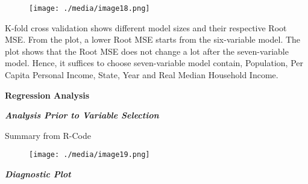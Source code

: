 \documentclass[12pt]{article}
\begin{document}
\begin{figure}[H]
	\begin{Center}
		\texttt{[image: ./media/image18.png]}
	\end{Center}
\end{figure}



\par

K-fold cross validation shows different model sizes and their respective Root MSE. From the plot, a lower Root MSE starts from the six-variable model. The plot shows that the Root MSE does not change a lot after the seven-variable model. Hence, it suffices to choose seven-variable model contain, Population, Per Capita Personal Income, State, Year and Real Median Household Income.\par

\begin{Center}
\textbf{Regression Analysis}
\end{Center}\par

\textbf{\textit{Analysis Prior to Variable Selection}}\par

Summary from R-Code\par




\begin{figure}[H]
	\begin{Center}
		\texttt{[image: ./media/image19.png]}
	\end{Center}
\end{figure}



\par


\vspace{\baselineskip}
\begin{justify}
\textbf{\textit{Diagnostic Plot}}
\end{justify}\par



\end{document}
